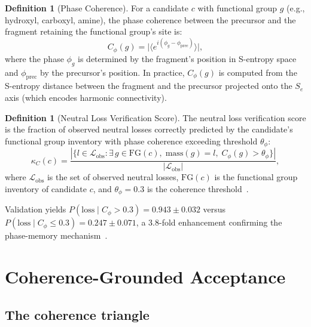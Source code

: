 \documentclass[twocolumn,10pt,a4paper]{article}
\theoremstyle{thmstyle}
\theoremstyle{definition}
\newtheorem{definition}[theorem]{Definition}
\theoremstyle{remark}
\newcommand{\Se}{S_{e}}
\newcommand{\calL}{\mathcal{L}}
\begin{document}
\begin{definition}[Phase Coherence]
\label{def:phase-coherence}
For a candidate $c$ with functional group $g$ (e.g., hydroxyl,
carboxyl, amine), the phase coherence between the precursor and the
fragment retaining the functional group's site is:
\begin{equation}
C_{\phi}(g) = \bigl|\bigl\langle
  e^{i(\phi_g - \phi_{\mathrm{prec}})}
\bigr\rangle\bigr|,
\label{eq:phase-coherence}
\end{equation}
where the phase $\phi_g$ is determined by the fragment's position in
S-entropy space and $\phi_{\mathrm{prec}}$ by the precursor's
position. In practice, $C_{\phi}(g)$ is computed from the S-entropy
distance between the fragment and the precursor projected onto the
$\Se$ axis (which encodes harmonic connectivity).
\end{definition}

\begin{definition}[Neutral Loss Verification Score]
\label{def:nl-score}
The neutral loss verification score is the fraction of observed neutral
losses correctly predicted by the candidate's functional group
inventory with phase coherence exceeding threshold $\theta_{\phi}$:
\begin{equation}
\kappa_C(c) = \frac{|\{l \in \calL_{\mathrm{obs}} :
  \exists\, g \in \mathrm{FG}(c),\;
  \mathrm{mass}(g) = l,\;
  C_{\phi}(g) > \theta_{\phi}\}|}
  {|\calL_{\mathrm{obs}}|},
\label{eq:kappa-c}
\end{equation}
where $\calL_{\mathrm{obs}}$ is the set of observed neutral losses,
$\mathrm{FG}(c)$ is the functional group inventory of candidate $c$,
and $\theta_{\phi} = 0.3$ is the coherence
threshold~\citep{sachikonye2024categorical}.
\end{definition}

Validation yields $P(\text{loss} \mid C_{\phi} > 0.3) = 0.943 \pm
0.032$ versus $P(\text{loss} \mid C_{\phi} \le 0.3) = 0.247 \pm
0.071$, a 3.8-fold enhancement confirming the phase-memory
mechanism~\citep{sachikonye2024categorical}.


\section{Coherence-Grounded Acceptance}
\label{sec:coherence}

\subsection{The coherence triangle}
\end{document}

